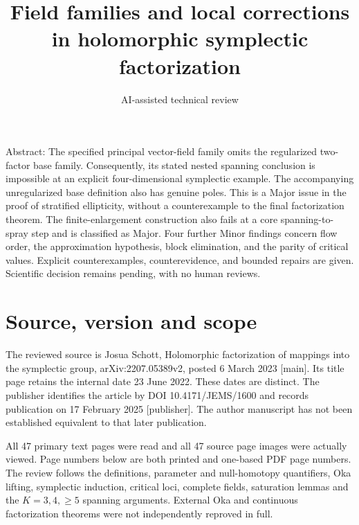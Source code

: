 \documentclass[10pt]{article}
\title{Field families and local corrections
in holomorphic symplectic factorization}
\author{AI-assisted technical review}
\date{}
\begin{document}
\maketitle
Abstract: The specified principal vector-field family omits the regularized two-factor base family. Consequently, its stated nested spanning conclusion is impossible at an explicit four-dimensional symplectic example. The accompanying unregularized base definition also has genuine poles. This is a Major issue in the proof of stratified ellipticity, without a counterexample to the final factorization theorem. The finite-enlargement construction also fails at a core spanning-to-spray step and is classified as Major. Four further Minor findings concern flow order, the approximation hypothesis, block elimination, and the parity of critical values. Explicit counterexamples, counterevidence, and bounded repairs are given. Scientific decision remains pending, with no human reviews.\par
\section*{Source, version and scope}
The reviewed source is Josua Schott, Holomorphic factorization of mappings into the symplectic group, arXiv:2207.05389v2, posted 6 March 2023 [main]. Its title page retains the internal date 23 June 2022. These dates are distinct. The publisher identifies the article by DOI 10.4171/JEMS/1600 and records publication on 17 February 2025 [publisher]. The author manuscript has not been established equivalent to that later publication.\par
All 47 primary text pages were read and all 47 source page images were actually viewed. Page numbers below are both printed and one-based PDF page numbers. The review follows the definitions, parameter and null-homotopy quantifiers, Oka lifting, symplectic induction, critical loci, complete fields, saturation lemmas and the \(K=3,4,\ge5\) spanning arguments. External Oka and continuous factorization theorems were not independently reproved in full.\par
\end{document}
